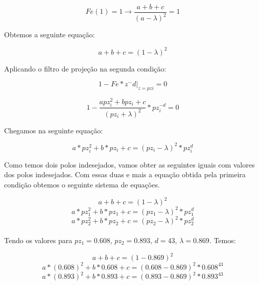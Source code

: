 \documentclass[a4paper,12pt]{article}
\begin{document}
\begin{equation}
Fe(1) = 1 \rightarrow \frac{a+b+c}{(a-\lambda)^2} = 1
\end{equation}

Obtemos a seguinte equação:

\begin{equation}
a+b+c = (1-\lambda)^2
\end{equation}

Aplicando o filtro de projeção na segunda condição:

\begin{equation}
1-Fe * z ^-d |_{z=pzi} = 0
\end{equation}

\begin{equation}
1-\frac{apz^2_i + bpz_i + c}{(pz_i + \lambda)^2} * pz^{-d}_i = 0
\end{equation}

Chegamos na seguinte equação:

\begin{equation}
a * pz^2_i + b*pz_i + c = (pz_i - \lambda)^2 * pz^d_i
\end{equation}

Como temos dois polos indesejados, vamos obter as seguintes iguais com valores dos polos indesejados. Com essas duas e mais a equação obtida pela primeira condição obtemos o seguinte sistema de equações.

\begin{equation}
a + b + c = (1 - \lambda)^2
\end{equation}
\begin{equation}
a * pz^2_1 + b * pz_1 + c = (pz_1 - \lambda)^2 * pz^d_1
\end{equation}
\begin{equation}
a * pz^2_2 + b * pz_2 + c = (pz_2 - \lambda)^2 * pz^d_2
\end{equation}\\


Tendo os valores para $pz_1 = 0.608$, $pz_2 = 0.893$, $d = 43$, $\lambda = 0.869$. Temos:


\begin{equation}
a + b + c = (1 - 0.869)^2
\end{equation}
\begin{equation}
a * (0.608)^2 + b * 0.608  + c = (0.608 - 0.869)^2 * 0.608^{43}
\end{equation}
\begin{equation}
a * (0.893)^2 + b * 0.893  + c = (0.893 - 0.869)^2 * 0.893^{43}
\end{equation}\\
\end{document}
